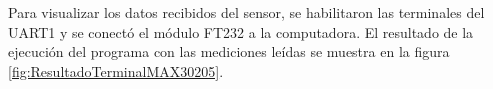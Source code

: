%
%
%
%
%
%	
%
%
%
%

Para visualizar los datos recibidos del sensor, se habilitaron las terminales del UART1 y se conectó el módulo FT232 a la computadora. El resultado de la ejecución del programa con las mediciones leídas se muestra en la figura \ref{fig:ResultadoTerminalMAX30205}.\\



